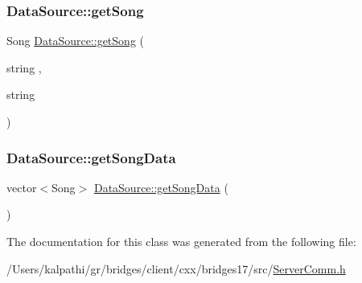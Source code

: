\subsubsection{\texorpdfstring{Data\+Source\+::get\+Song}{DataSource::getSong}}
{\footnotesize\ttfamily Song \mbox{\hyperlink{namespacebridges_1_1_data_source_a284c9d572415b67df6989ab8ab97d0e2}{Data\+Source\+::get\+Song}} (\begin{DoxyParamCaption}\item[{string}]{,  }\item[{string}]{ }\end{DoxyParamCaption})\hspace{0.3cm}{\ttfamily [friend]}}

\mbox{\label{classbridges_1_1_server_comm_ada47f365ba4e6c3ef6dbca3afdd20b3f}} 
\subsubsection{\texorpdfstring{Data\+Source\+::get\+Song\+Data}{DataSource::getSongData}}
{\footnotesize\ttfamily vector$<$Song$>$ \mbox{\hyperlink{namespacebridges_1_1_data_source_a325b6f25041e833bc2fd561bd2c2ee6e}{Data\+Source\+::get\+Song\+Data}} (\begin{DoxyParamCaption}{ }\end{DoxyParamCaption})\hspace{0.3cm}{\ttfamily [friend]}}



The documentation for this class was generated from the following file\+:\begin{DoxyCompactItemize}
\item 
/\+Users/kalpathi/gr/bridges/client/cxx/bridges17/src/\mbox{\hyperlink{_server_comm_8h}{Server\+Comm.\+h}}\end{DoxyCompactItemize}
